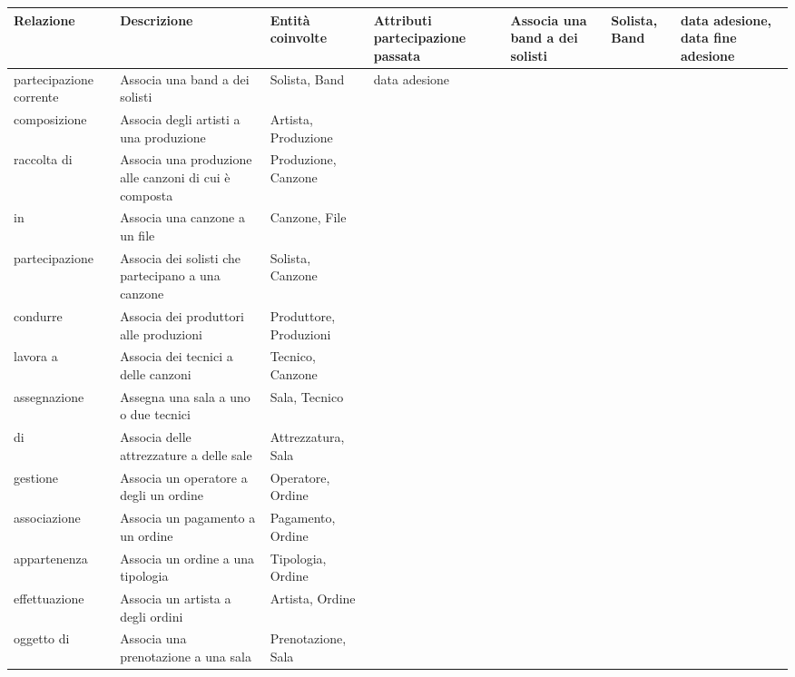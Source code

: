 \documentclass{article}
\begin{document}
\renewcommand*{\arraystretch}{1.4}
\begin{longtable}{|p{.15\linewidth}|p{.25\linewidth}|p{.2\linewidth}|p{.2\linewidth}|}
    \hline
    \textbf{Relazione} & \textbf{Descrizione} & \textbf{Entità coinvolte} & \textbf{Attributi} 
    \endhead 
    \hline
     partecipazione passata & Associa una band a dei solisti & Solista, Band & data adesione, data fine adesione \\ \hline
     partecipazione corrente & Associa una band a dei solisti & Solista, Band & data adesione \\ \hline
     composizione & Associa degli artisti a una produzione & Artista, Produzione & \\ \hline
     raccolta di & Associa una produzione alle canzoni di cui è composta & Produzione, Canzone & \\ \hline
     in & Associa una canzone a un file & Canzone, File & \\ \hline
     partecipazione & Associa dei solisti che partecipano a una canzone & Solista, Canzone & \\ \hline
     condurre & Associa dei produttori alle produzioni & Produttore, Produzioni & \\ \hline
     lavora a & Associa dei tecnici a delle canzoni & Tecnico, Canzone & \\ \hline
     assegnazione & Assegna una sala a uno o due tecnici & Sala, Tecnico & \\ \hline
     di & Associa delle attrezzature a delle sale & Attrezzatura, Sala &  \\ \hline
     gestione & Associa un operatore a degli un ordine & Operatore, Ordine &  \\ \hline
     associazione & Associa un pagamento a un ordine & Pagamento, Ordine &  \\ \hline
     appartenenza & Associa un ordine a una tipologia & Tipologia, Ordine &  \\ \hline
     effettuazione & Associa un artista a degli ordini & Artista, Ordine &  \\ \hline
     oggetto di & Associa una prenotazione a una sala & Prenotazione, Sala &  \\ \hline
\end{longtable}
\end{document}
